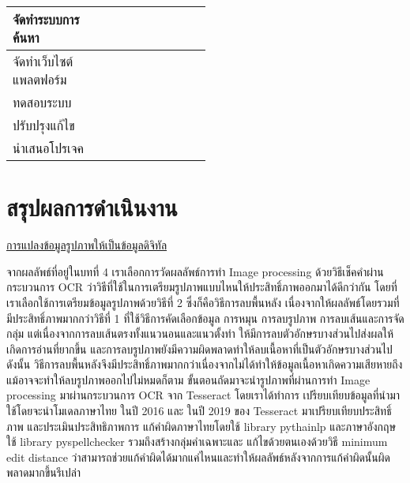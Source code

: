 \begin{table}[H]
\begin{tabular}{|p{0.5\linewidth}|l|l|l|}
จัดทำระบบการค้นหา                                                                    &                                      &           &  \cellcolor[HTML]{92D050}                               \\ \hline
จัดทำเว็บไซต์แพลตฟอร์ม                                                               &                                      &                                     & \cellcolor[HTML]{92D050}       \\ \hline
ทดสอบระบบ                                                                            &                                      &            &  \cellcolor[HTML]{92D050}                               \\ \hline
ปรับปรุงแก้ไข                                                                        &                                      & 	            &   \cellcolor[HTML]{92D050}                             \\ \hline
นำเสนอโปรเจค                                                                         &                 & \cellcolor[HTML]{FFC702}	               &                                 \\ \hline
\end{tabular}
\end{table}

\section{สรุปผลการดำเนินงาน}

\underline{การแปลงข้อมูลรูปภาพให้เป็นข้อมูลดิจิทัล}

จากผลลัพธ์ที่อยู่ในบทที่ 4 เราเลือกการวัดผลลัพธ์การทำ Image processing ด้วยวิธีเช็คคำผ่านกระบวนการ OCR ว่าวิธีที่ใช้ในการเตรียมรูปภาพแบบไหนให้ประสิทธิ์ภาพออกมาได้ดีกว่ากัน
โดยที่เราเลือกใช้การเตรียมข้อมูลรูปภาพด้วยวิธีที่ 2 ซึ่งก็คือวิธีการลบพื้นหลัง เนื่องจากให้ผลลัพธ์โดยรวมที่มีประสิทธิ์ภาพมากกว่าวิธีที่ 1 
ที่ใช้วิธีการคัดเลือกข้อมูล การหมุน การลบรูปภาพ การลบเส้นและการจัดกลุ่ม แต่เนื่องจากการลบเส้นตรงทั้งแนวนอนและแนวตั้งทำ
ให้มีการลบตัวอักษรบางส่วนไปส่งผลให้เกิดการอ่านที่ยากขึ้น 
และการลบรูปภาพยังมีความผิดพลาดทำให้ลบเนื้อหาที่เป็นตัวอักษรบางส่วนไป ดังนั้น
วิธีการลบพื้นหลังจึงมีประสิทธิ์ภาพมากกว่าเนื่องจากไม่ได้ทำให้ข้อมูลเนื้อหาเกิดความเสียหายถึงแม้อาจจะทำให้ลบรูปภาพออกไปไม่หมดก็ตาม 
ขั้นตอนถัดมาจะนำรูปภาพที่ผ่านการทำ Image processing มาผ่านกระบวนการ OCR จาก Tesseract โดยเราได้ทำการ
เปรียบเทียบข้อมูลที่นำมาใช้โดยจะนำโมเดลภาษาไทย ในปี 2016 และ ในปี 2019 ของ Tesseract มาเปรียบเทียบประสิทธิ์ภาพ และประเมินประสิทธิภาพการ
แก้คำผิดภาษาไทยโดยใช้ library pythainlp และภาษาอังกฤษใช้ library pyspellchecker รวมถึงสร้างกลุ่มคำเฉพาะและ
แก้ไขด้วยตนเองด้วยวิธี minimum edit distance ว่าสามารถช่วยแก้คำผิดได้มากแค่ไหนและทำให้ผลลัพธ์หลังจากการแก้คำผิดนั้นผิดพลาดมากขึ้นรึเปล่า

